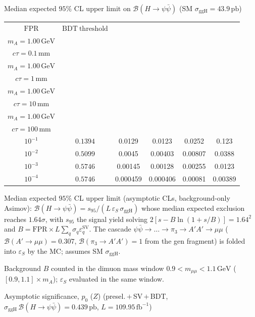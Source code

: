 \documentclass[10pt,a4paper]{article}
\begin{document}
{\vspace{12pt}

Median expected $95\%$ CL upper limit on $\mathcal{B}(H\to\psi\bar{\psi})$ (SM $\sigma_{\mathrm{ggH}}=43.9\,\mathrm{pb}$)

\begin{tabular}{cccccc}
\toprule
$\mathrm{FPR}$ & $\mathrm{BDT\ threshold}$ & \shortstack{$m_{\pi}=10\,\mathrm{GeV}$\\$m_{A}=1.00\,\mathrm{GeV}$\\$c\tau=0.1\,\mathrm{mm}$} & \shortstack{$m_{\pi}=10\,\mathrm{GeV}$\\$m_{A}=1.00\,\mathrm{GeV}$\\$c\tau=1\,\mathrm{mm}$} & \shortstack{$m_{\pi}=10\,\mathrm{GeV}$\\$m_{A}=1.00\,\mathrm{GeV}$\\$c\tau=10\,\mathrm{mm}$} & \shortstack{$m_{\pi}=10\,\mathrm{GeV}$\\$m_{A}=1.00\,\mathrm{GeV}$\\$c\tau=100\,\mathrm{mm}$} \\
\midrule
$10^{-1}$ & $0.1394$ & 0.0129 & 0.0123 & 0.0252 & 0.123\\
$10^{-2}$ & $0.5099$ & 0.0045 & 0.00403 & 0.00807 & 0.0388\\
$10^{-3}$ & $0.5746$ & 0.00145 & 0.00128 & 0.00255 & 0.0123\\
$10^{-4}$ & $0.5746$ & 0.000459 & 0.000406 & 0.00081 & 0.00389\\
\bottomrule
\end{tabular}

{\small Median expected $95\%$ CL upper limit (asymptotic CLs, background-only Asimov): $\mathcal{B}(H\to\psi\bar{\psi})=s_{95}/(L\,\varepsilon_S\,\sigma_{\mathrm{ggH}})$ whose median expected exclusion reaches $1.64\sigma$, with $s_{95}$ the signal yield solving $2[s-B\ln(1{+}s/B)]=1.64^2$ and $B=\mathrm{FPR}\times L\sum_q\sigma_q\varepsilon_q^{\mathrm{SV}}$. The cascade $\psi\bar{\psi}\to\ldots\to\pi_3\to A'A'\to\mu\mu$ ($\mathcal{B}(A'\to\mu\mu)=0.307$, $\mathcal{B}(\pi_3\to A'A')=1$ from the gen fragment) is folded into $\varepsilon_S$ by the MC; assumes SM $\sigma_{\mathrm{ggH}}$.}

{\small Background $B$ counted in the dimuon mass window $0.9<m_{\mu\mu}<1.1\,\mathrm{GeV}$ ($[0.9,1.1]\times m_A$); $\varepsilon_S$ evaluated in the same window.}

\vspace{12pt}

Asymptotic significance, $p_0$ ($Z$) (presel.\,$+$\,SV\,$+$\,BDT, $\sigma_{\mathrm{ggH}}\,\mathcal{B}(H\to\psi\bar{\psi})=0.439\,\mathrm{pb}$, $L=109.95\,\mathrm{fb}^{-1}$)

}
\end{document}
